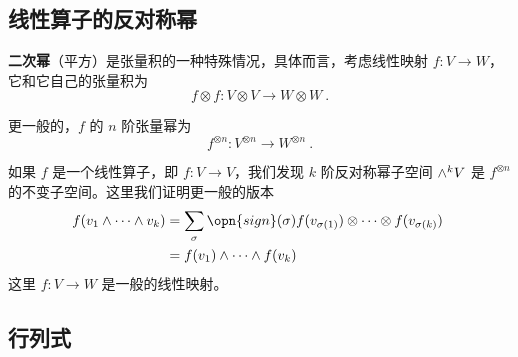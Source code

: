
\begin{issues}
\issueDraft
{}
\end{issues}


\subsection{线性算子的反对称幂}

\textbf{二次幂}（平方）是张量积的一种特殊情况，具体而言，考虑线性映射 $f: V \to W$，它和它自己的张量积为
\begin{equation}
f \otimes f: V \otimes V \to W \otimes W~.
\end{equation}

更一般的，$f$ 的 $n$ 阶张量幂为
\begin{equation}
f^{\otimes n}: V^{\otimes n} \to W^{\otimes n}~.
\end{equation}

如果 $f$ 是一个线性算子，即 $f: V \to V$，我们发现 $k$ 阶反对称幂子空间 ${\large \wedge}^k V$ 是 $f^{\otimes n}$ 的不变子空间。这里我们证明更一般的版本
\begin{equation}
\begin{aligned}
f(v_1 \wedge \cdots \wedge v_k) &= \sum_\sigma \opn{sign}(\sigma) f(v_{\sigma(1)}) \otimes \cdots \otimes f(v_{\sigma(k)}) \\
&= f(v_1) \wedge \cdots \wedge f(v_k)
\end{aligned}~
\end{equation}
这里 $f: V \to W$ 是一般的线性映射。




\subsection{行列式}

